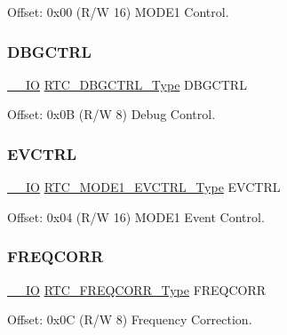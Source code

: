 Offset\+: 0x00 (R/W 16) M\+O\+D\+E1 Control. 

\mbox{\label{struct_rtc_mode1_a291f72f633a731e348a16601bc63a11a}} 
\subsubsection{\texorpdfstring{DBGCTRL}{DBGCTRL}}
{\footnotesize\ttfamily \mbox{\hyperlink{core__cm0plus_8h_aec43007d9998a0a0e01faede4133d6be}{\+\_\+\+\_\+\+IO}} \mbox{\hyperlink{union_r_t_c___d_b_g_c_t_r_l___type}{R\+T\+C\+\_\+\+D\+B\+G\+C\+T\+R\+L\+\_\+\+Type}} D\+B\+G\+C\+T\+RL}



Offset\+: 0x0B (R/W 8) Debug Control. 

\mbox{\label{struct_rtc_mode1_a4c3fb986310c6f3687e484ac365def5b}} 
\subsubsection{\texorpdfstring{EVCTRL}{EVCTRL}}
{\footnotesize\ttfamily \mbox{\hyperlink{core__cm0plus_8h_aec43007d9998a0a0e01faede4133d6be}{\+\_\+\+\_\+\+IO}} \mbox{\hyperlink{union_r_t_c___m_o_d_e1___e_v_c_t_r_l___type}{R\+T\+C\+\_\+\+M\+O\+D\+E1\+\_\+\+E\+V\+C\+T\+R\+L\+\_\+\+Type}} E\+V\+C\+T\+RL}



Offset\+: 0x04 (R/W 16) M\+O\+D\+E1 Event Control. 

\mbox{\label{struct_rtc_mode1_a6895b43aadf5f05e11817146109d789a}} 
\subsubsection{\texorpdfstring{FREQCORR}{FREQCORR}}
{\footnotesize\ttfamily \mbox{\hyperlink{core__cm0plus_8h_aec43007d9998a0a0e01faede4133d6be}{\+\_\+\+\_\+\+IO}} \mbox{\hyperlink{union_r_t_c___f_r_e_q_c_o_r_r___type}{R\+T\+C\+\_\+\+F\+R\+E\+Q\+C\+O\+R\+R\+\_\+\+Type}} F\+R\+E\+Q\+C\+O\+RR}



Offset\+: 0x0C (R/W 8) Frequency Correction. 

